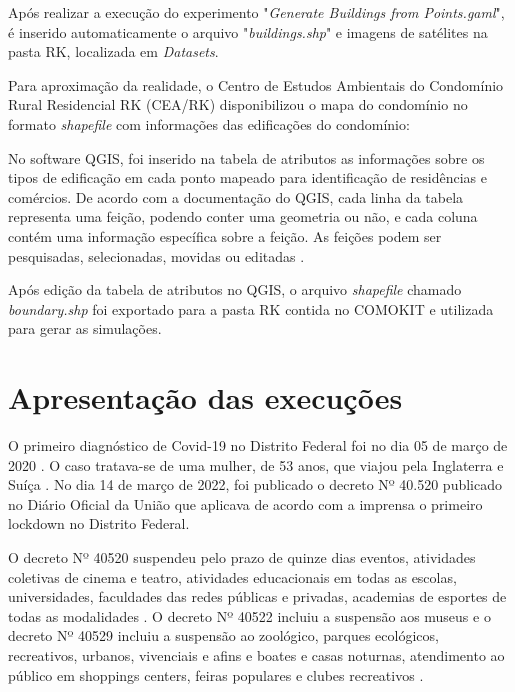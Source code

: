 
Após realizar a execução do experimento "\textit{Generate Buildings from Points.gaml}", é inserido automaticamente o arquivo "\textit{buildings.shp}" e imagens de satélites na pasta RK, localizada em \textit{Datasets}.

Para aproximação da realidade, o Centro de Estudos Ambientais do Condomínio Rural Residencial RK (CEA/RK) disponibilizou o mapa do condomínio no formato \textit{shapefile} com informações das edificações do condomínio:


No software QGIS, foi inserido na tabela de atributos as informações sobre os tipos de edificação em cada ponto mapeado para identificação de residências e comércios. De acordo com a documentação do QGIS, cada linha da tabela representa uma feição, podendo conter uma geometria ou não, e cada coluna contém uma informação específica sobre a feição. As feições podem ser pesquisadas, selecionadas, movidas ou editadas \cite{DocQGIS:online}.


Após edição da tabela de atributos no QGIS, o arquivo \textit{shapefile} chamado \textit{boundary.shp} foi exportado para a pasta RK contida no COMOKIT e utilizada para gerar as simulações.



\section{Apresentação das execuções}

O primeiro diagnóstico de Covid-19 no Distrito Federal foi no dia 05 de março de 2020 \cite{SESCovid19S7:online}. O caso tratava-se de uma mulher, de 53 anos, que viajou pela Inglaterra e Suíça \cite{Brasilco67:online}. No dia 14 de março de 2022, foi publicado o decreto Nº 40.520 publicado no Diário Oficial da União que aplicava de acordo com a imprensa \cite{CorreioBraziliense032020:online} o primeiro lockdown no Distrito Federal.

O decreto Nº 40520 suspendeu pelo prazo de quinze dias eventos, atividades coletivas de cinema e teatro, atividades educacionais em todas as escolas, universidades, faculdades das redes públicas e privadas, academias de esportes de todas as modalidades \cite{Brasilco67:online}. O decreto Nº 40522 incluiu a suspensão aos museus \cite{Decreto441:online} e o decreto Nº 40529 incluiu a suspensão ao zoológico, parques ecológicos, recreativos, urbanos, vivenciais e afins e boates e casas noturnas, atendimento ao público em shoppings centers, feiras populares e clubes recreativos \cite{Decreto412:online}.

